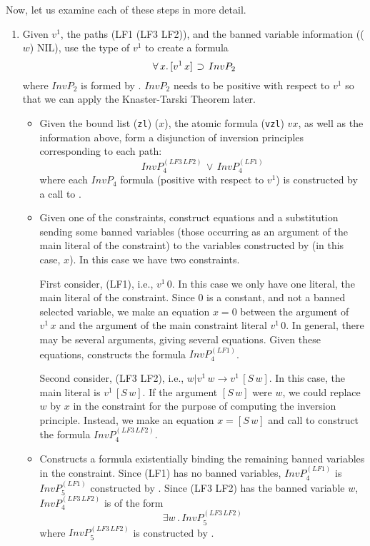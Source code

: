 Now, let us examine each of these steps in more detail.

\begin{enumerate}
\item {\bf {}}  Given $v^1$, the paths
(LF1 (LF3 LF2)), and the banned variable information
(($w$) NIL), use the type of $v^1$ to create a formula
$$\forall \,x . \, [v^1\, x] \, \mathbin{\supset}\, InvP_2$$
where $InvP_2$ is formed by .
$InvP_2$ needs to be positive with respect to $v^1$ so that
we can apply the Knaster-Tarski Theorem later.

\begin{itemize}
\item {\bf {}}  Given the bound list
(\verb+zl+) ($x$), the atomic formula (\verb+vzl+) $v x$, as well as
the information above, form a disjunction of inversion principles
corresponding to each path:
$$InvP_4^{(LF3\, LF2)} \, \lor\, InvP_4^{(LF1)}$$
where each $InvP_4$ formula (positive with respect to $v^1$) is constructed by a call to 
.

\item {\bf {}}  Given one of the constraints,
construct equations and a substitution sending some banned variables (those occurring
as an argument of the main literal of the constraint) to the variables
constructed by  (in this case, $x$).
In this case we have two constraints.  

First consider, (LF1), i.e., $v^1\, 0$.  In this case we only have one literal,
the main literal of the constraint.  Since $0$ is a constant, and not a banned
selected variable, we make an equation $x = 0$ between the argument of $v^1\, x$
and the argument of the main constraint literal $v^1\, 0$.  In general, there
may be several arguments, giving several equations.  Given these equations,
 constructs the formula $InvP_4^{(LF1)}$.

Second consider, (LF3 LF2), i.e., $w|v^1\, w \rightarrow v^1 \, [S\, w]$.
In this case, the main literal is $v^1\, [S\, w]$.  If the argument $[S\, w]$
were $w$, we could replace $w$ by $x$ in the constraint for the purpose
of computing the inversion principle.
Instead, we make an equation $x = [S\, w]$ and call
 to construct the formula $InvP_4^{(LF3\, LF2)}$.

\item {\bf {}}  Constructs a formula
existentially binding the remaining banned variables in the constraint.
Since (LF1) has no banned variables, $InvP_4^{(LF1)}$ is $InvP_5^{(LF1)}$
constructed by .  Since (LF3 LF2)
has the banned variable $w$, $InvP_4^{(LF3\, LF2)}$ is of the form
$$\exists w\, . \, InvP_5^{(LF3\, LF2)}$$
where $InvP_5^{(LF3\, LF2)}$ is constructed by .


\end{itemize}
\end{enumerate}
